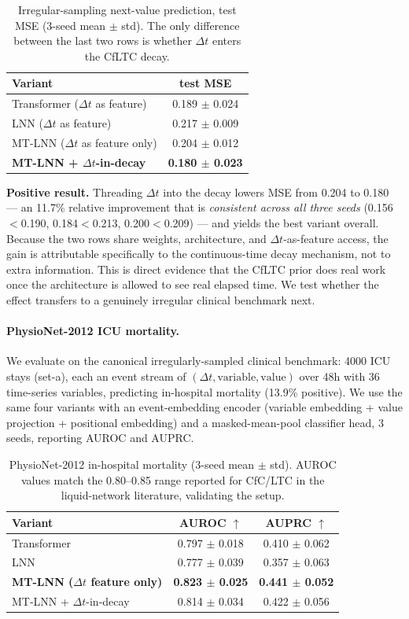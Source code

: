 \documentclass[11pt]{article}
\theoremstyle{definition}
\begin{document}
\begin{table}[h]
\centering
\caption{Irregular-sampling next-value prediction, test MSE (3-seed mean $\pm$ std). The only difference between the last two rows is whether $\Delta t$ enters the CfLTC decay.}
\label{tab:irregular}
\begin{tabular}{lc}
\toprule
Variant & test MSE \\
\midrule
Transformer ($\Delta t$ as feature) & 0.189 $\pm$ 0.024 \\
LNN ($\Delta t$ as feature) & 0.217 $\pm$ 0.009 \\
MT-LNN ($\Delta t$ as feature only) & 0.204 $\pm$ 0.012 \\
\textbf{MT-LNN + $\Delta t$-in-decay} & \textbf{0.180 $\pm$ 0.023} \\
\bottomrule
\end{tabular}
\end{table}

\textbf{Positive result.} Threading $\Delta t$ into the decay lowers MSE from 0.204 to 0.180 — an 11.7\% relative improvement that is \emph{consistent across all three seeds} (0.156$<$0.190, 0.184$<$0.213, 0.200$<$0.209) — and yields the best variant overall. Because the two rows share weights, architecture, and $\Delta t$-as-feature access, the gain is attributable specifically to the continuous-time decay mechanism, not to extra information. This is direct evidence that the CfLTC prior does real work once the architecture is allowed to see real elapsed time. We test whether the effect transfers to a genuinely irregular clinical benchmark next.

\paragraph{PhysioNet-2012 ICU mortality.} We evaluate on the canonical irregularly-sampled clinical benchmark: 4000 ICU stays (set-a), each an event stream of $(\Delta t,\text{variable},\text{value})$ over 48h with 36 time-series variables, predicting in-hospital mortality (13.9\% positive). We use the same four variants with an event-embedding encoder (variable embedding + value projection + positional embedding) and a masked-mean-pool classifier head, 3 seeds, reporting AUROC and AUPRC.

\begin{table}[h]
\centering
\caption{PhysioNet-2012 in-hospital mortality (3-seed mean $\pm$ std). AUROC values match the 0.80--0.85 range reported for CfC/LTC in the liquid-network literature, validating the setup.}
\label{tab:physionet}
\begin{tabular}{lcc}
\toprule
Variant & AUROC $\uparrow$ & AUPRC $\uparrow$ \\
\midrule
Transformer & 0.797 $\pm$ 0.018 & 0.410 $\pm$ 0.062 \\
LNN & 0.777 $\pm$ 0.039 & 0.357 $\pm$ 0.063 \\
\textbf{MT-LNN ($\Delta t$ feature only)} & \textbf{0.823 $\pm$ 0.025} & \textbf{0.441 $\pm$ 0.052} \\
MT-LNN + $\Delta t$-in-decay & 0.814 $\pm$ 0.034 & 0.422 $\pm$ 0.056 \\
\bottomrule
\end{tabular}
\end{table}
\end{document}
